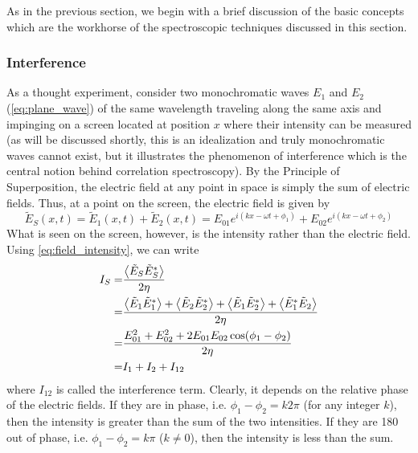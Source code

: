 As in the previous section, we begin with a brief discussion of the basic concepts which are the workhorse of the spectroscopic techniques discussed in this section.

\subsubsection{Interference}
As a thought experiment, consider two monochromatic waves $E_1$ and $E_2$ (\autoref{eq:plane_wave}) of the same wavelength traveling along the same axis and impinging on a screen located at position $x$ where their intensity can be measured (as will be discussed shortly, this is an idealization and truly monochromatic waves cannot exist, but it illustrates the phenomenon of interference which is the central notion behind correlation spectroscopy). By the Principle of Superposition, the electric field at any point in space is simply the sum of electric fields. Thus, at a point on the screen, the electric field is given by
\begin{equation} \label{eq:interference_field_sum}
\tilde{E}_S(x,t) = \tilde{E}_1(x,t)+\tilde{E}_2(x,t) = E_{01}e^{i(kx-\omega t+\phi_1)} + E_{02}e^{i(kx-\omega t+\phi_2)} 
\end{equation}
What is seen on the screen, however, is the intensity rather than the electric field. Using \autoref{eq:field_intensity}, we can write
\begin{align}
I_S  =& \frac{\expval{\tilde{E}_S\tilde{E}_S^*}}{2\eta} \\
     =& \frac{\expval{\tilde{E}_1\tilde{E}_1^*} 
         + \expval{\tilde{E}_2\tilde{E}_2^*} 
         + \expval{\tilde{E}_1\tilde{E}_2^*} 
         + \expval{\tilde{E}_1^*\tilde{E}_2}}{2\eta} \label{eq:interference} \\
     =& \frac{E_{01}^2 + E_{02}^2 + 2E_{01}E_{02}\cos(\phi_1-\phi_2)}{2\eta} \\
     =& I_1 + I_2 + I_{12}
\end{align}
where $I_{12}$ is called the interference term. Clearly, it depends on the relative phase of the electric fields. If they are in phase, i.e. $\phi_1-\phi_2=k2\pi$ (for any integer $k$), then the intensity is greater than the sum of the two intensities. If they are 180\textdegree{} out of phase, i.e. $\phi_1-\phi_2=k\pi$ ($k\neq 0$), then the intensity is less than the sum. 

